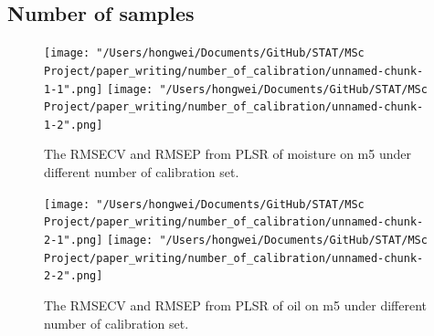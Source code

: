 \documentclass[a4paper,12pt,titlepage]{article} %
\numberwithin{equation}{section}  %
\begin{document}
	\clearpage	
	
	\clearpage
	\begin{appendices}
		\section{Number of samples}
		\label{app:Number_of_samples}
			
			\begin{figure}[h]    %
			\centering           %
			\texttt{[image: "/Users/hongwei/Documents/GitHub/STAT/MSc Project/paper\_writing/number\_of\_calibration/unnamed-chunk-1-1".png]}  %
			\texttt{[image: "/Users/hongwei/Documents/GitHub/STAT/MSc Project/paper\_writing/number\_of\_calibration/unnamed-chunk-1-2".png]}  %
			\caption{The RMSECV and RMSEP from PLSR of moisture on m5 under different number of calibration set.}          %
			\label{fig:calibration_1-1}               %
			\end{figure}                        %

			\begin{figure}[h]    %
	\centering           %
	\texttt{[image: "/Users/hongwei/Documents/GitHub/STAT/MSc Project/paper\_writing/number\_of\_calibration/unnamed-chunk-2-1".png]}  %
	\texttt{[image: "/Users/hongwei/Documents/GitHub/STAT/MSc Project/paper\_writing/number\_of\_calibration/unnamed-chunk-2-2".png]}  %
	\caption{The RMSECV and RMSEP from PLSR of oil on m5 under different number of calibration set.}          %
	\label{fig:calibration_2-1}               %
\end{figure}                        %



\end{appendices}
\end{document}
